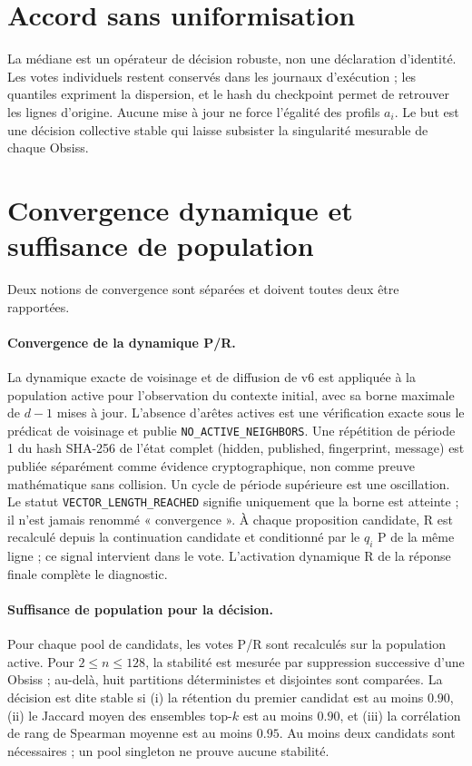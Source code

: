 \documentclass[11pt,a4paper]{report}
\begin{document}
\section{Accord sans uniformisation}
La médiane est un opérateur de décision robuste, non une déclaration d'identité. Les votes individuels restent conservés dans les journaux d'exécution ; les quantiles expriment la dispersion, et le hash du checkpoint permet de retrouver les lignes d'origine. Aucune mise à jour ne force l'égalité des profils $a_i$. Le but est une décision collective stable qui laisse subsister la singularité mesurable de chaque Obsiss.

\section{Convergence dynamique et suffisance de population}
Deux notions de convergence sont séparées et doivent toutes deux être rapportées.

\paragraph{Convergence de la dynamique P/R.} La dynamique exacte de voisinage et de diffusion de v6 est appliquée à la population active pour l'observation du contexte initial, avec sa borne maximale de $d-1$ mises à jour. L'absence d'arêtes actives est une vérification exacte sous le prédicat de voisinage et publie \texttt{NO\_ACTIVE\_NEIGHBORS}. Une répétition de période 1 du hash SHA-256 de l'état complet (hidden, published, fingerprint, message) est publiée séparément comme évidence cryptographique, non comme preuve mathématique sans collision. Un cycle de période supérieure est une oscillation. Le statut \texttt{VECTOR\_LENGTH\_REACHED} signifie uniquement que la borne est atteinte ; il n'est jamais renommé « convergence ». À chaque proposition candidate, R est recalculé depuis la continuation candidate et conditionné par le $q_i$ P de la même ligne ; ce signal intervient dans le vote. L'activation dynamique R de la réponse finale complète le diagnostic.

\paragraph{Suffisance de population pour la décision.} Pour chaque pool de candidats, les votes P/R sont recalculés sur la population active. Pour $2\leq n\leq128$, la stabilité est mesurée par suppression successive d'une Obsiss ; au-delà, huit partitions déterministes et disjointes sont comparées. La décision est dite stable si (i) la rétention du premier candidat est au moins $0.90$, (ii) le Jaccard moyen des ensembles top-$k$ est au moins $0.90$, et (iii) la corrélation de rang de Spearman moyenne est au moins $0.95$. Au moins deux candidats sont nécessaires ; un pool singleton ne prouve aucune stabilité.
\end{document}
